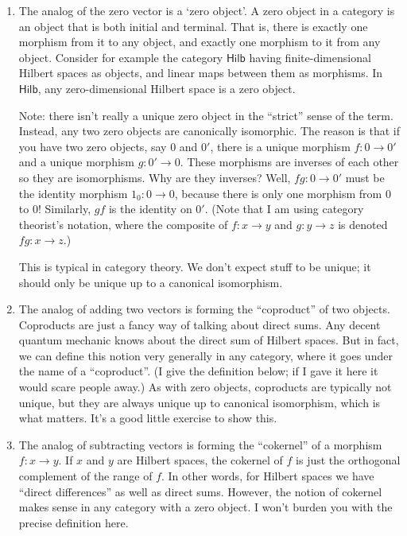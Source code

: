 \documentclass{article}
\begin{document}
\begin{enumerate}
\def\labelenumi{\arabic{enumi})}
\item
  The analog of the zero vector is a `zero object'. A zero object in a
  category is an object that is both initial and terminal. That is,
  there is exactly one morphism from it to any object, and exactly one
  morphism to it from any object. Consider for example the category
  \(\mathsf{Hilb}\) having finite-dimensional Hilbert spaces as objects,
  and linear maps between them as morphisms. In \(\mathsf{Hilb}\), any
  zero-dimensional Hilbert space is a zero object.

  Note: there isn't really a unique zero object in the ``strict'' sense
  of the term. Instead, any two zero objects are canonically isomorphic.
  The reason is that if you have two zero objects, say \(0\) and \(0'\),
  there is a unique morphism \(f\colon 0\to 0'\) and a unique morphism
  \(g\colon 0'\to 0\). These morphisms are inverses of each other so
  they are isomorphisms. Why are they inverses? Well,
  \(fg\colon 0\to 0'\) must be the identity morphism
  \(1_0\colon 0 \to 0\), because there is only one morphism from \(0\)
  to \(0\)! Similarly, \(gf\) is the identity on \(0'\). (Note that I am
  using category theorist's notation, where the composite of
  \(f\colon x\to y\) and \(g\colon y\to z\) is denoted
  \(fg\colon x\to z\).)

  This is typical in category theory. We don't expect stuff to be
  unique; it should only be unique up to a canonical isomorphism.
\item
  The analog of adding two vectors is forming the ``coproduct'' of two
  objects. Coproducts are just a fancy way of talking about direct sums.
  Any decent quantum mechanic knows about the direct sum of Hilbert
  spaces. But in fact, we can define this notion very generally in any
  category, where it goes under the name of a ``coproduct''. (I give the
  definition below; if I gave it here it would scare people away.) As
  with zero objects, coproducts are typically not unique, but they are
  always unique up to canonical isomorphism, which is what matters. It's
  a good little exercise to show this.
\item
  The analog of subtracting vectors is forming the ``cokernel'' of a
  morphism \(f\colon x\to y\). If \(x\) and \(y\) are Hilbert spaces,
  the cokernel of \(f\) is just the orthogonal complement of the range
  of \(f\). In other words, for Hilbert spaces we have ``direct
  differences'' as well as direct sums. However, the notion of cokernel
  makes sense in any category with a zero object. I won't burden you
  with the precise definition here.
\end{enumerate}
\end{document}
